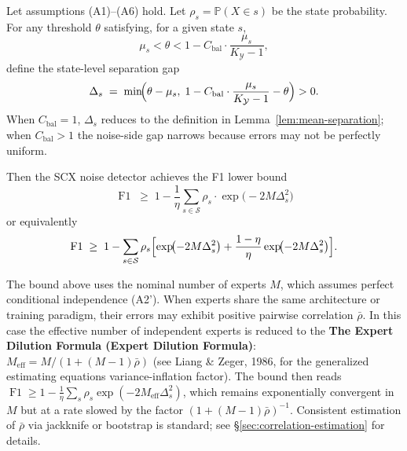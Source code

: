 \begin{theorem}
\label{thm:noise-detection}
Let assumptions (A1)--(A6) hold. Let $\rho_s = \mathbb{P}(X \in s)$ be the
state probability. For any threshold $\theta$ satisfying, for a given state $s$,
\[
\mu_s < \theta < 1 - C_{\text{bal}}\cdot\frac{\mu_s}{K_{\mathcal{Y}}-1},
\]
define the state-level separation gap
\begin{equation}
\Delta_s \;=\;
\min\!\Bigl(\theta - \mu_s,\;
  1 - C_{\text{bal}}\cdot\frac{\mu_s}{K_{\mathcal{Y}}-1} - \theta\Bigr)
> 0.
\label{eq:separation-gap-cbal}
\end{equation}
When $C_{\text{bal}} = 1$, $\Delta_s$ reduces to the definition in
Lemma~\ref{lem:mean-separation}; when $C_{\text{bal}} > 1$ the noise-side gap
narrows because errors may not be perfectly uniform.

Then the SCX noise detector achieves the F1 lower bound
\begin{equation}
\boxed{\;
\operatorname{F1} \;\geq\; 1 - \frac{1}{\eta}
\sum_{s \in \mathcal{S}} \rho_s \cdot
\exp\!\bigl(-2M\Delta_s^2\bigr)
\;}
\label{eq:f1-bound-hoeffding}
\end{equation}
or equivalently
\begin{equation}
\operatorname{F1} \;\geq\; 1 - \sum_{s \in \mathcal{S}} \rho_s \Bigl[
\exp\!\bigl(-2M\Delta_s^2\bigr)
+ \frac{1-\eta}{\eta}\exp\!\bigl(-2M\Delta_s^2\bigr)
\Bigr].
\label{eq:f1-bound-explicit}
\end{equation}
\end{theorem}

\begin{remark}
\label{rem:Meff}
The bound above uses the nominal number of experts $M$, which assumes
perfect conditional independence (A2'). When experts share the same
architecture or training paradigm, their errors may exhibit positive
pairwise correlation $\bar{\rho}$. In this case the effective number
of independent experts is reduced to the
\textbf{The Expert Dilution Formula (Expert Dilution Formula)}:
$M_{\text{eff}} = M / (1 + (M-1)\bar{\rho})$
(see Liang \& Zeger, 1986, for the generalized estimating equations
variance-inflation factor). The bound then reads
$\operatorname{F1} \geq 1 - \frac{1}{\eta}\sum_s \rho_s
\exp(-2M_{\text{eff}}\Delta_s^2)$, which remains exponentially
convergent in $M$ but at a rate slowed by the factor $(1+(M-1)\bar{\rho})^{-1}$.
Consistent estimation of $\bar{\rho}$ via jackknife or bootstrap is
standard; see \S\ref{sec:correlation-estimation} for details.
\end{remark}

